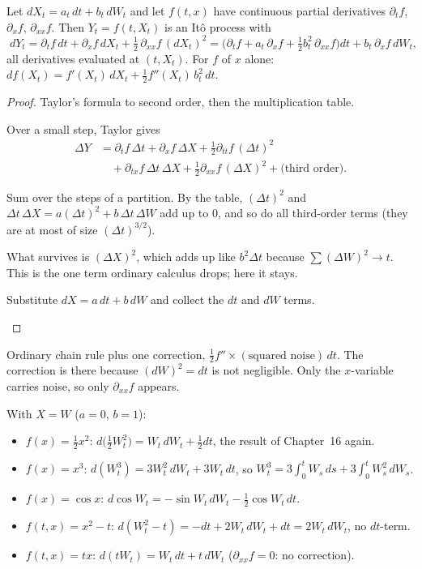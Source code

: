 \begin{theorem}
\label{thm:ito}
Let $dX_t=a_t\,dt+b_t\,dW_t$ and let $f(t,x)$ have continuous partial derivatives $\partial_tf$, $\partial_xf$, $\partial_{xx}f$. Then $Y_t=f(t,X_t)$ is an Itô process with
\[
  \boxed{\;dY_t=\partial_tf\,dt+\partial_xf\,dX_t+\tfrac12\,\partial_{xx}f\,(dX_t)^2
  =\Big(\partial_tf+a_t\,\partial_xf+\tfrac12b_t^2\,\partial_{xx}f\Big)dt+b_t\,\partial_xf\,dW_t,\;}
\]
all derivatives evaluated at $(t,X_t)$. For $f$ of $x$ alone: $df(X_t)=f'(X_t)\,dX_t+\frac12f''(X_t)\,b_t^2\,dt$.
\end{theorem}
\begin{proof}
Taylor's formula to second order, then the multiplication table.
\begin{steps}
  \item Over a small step, Taylor gives
  \[
    \begin{aligned}
    \Delta Y&=\partial_tf\,\Delta t+\partial_xf\,\Delta X+\tfrac12\partial_{tt}f\,(\Delta t)^2\\
    &\quad+\partial_{tx}f\,\Delta t\,\Delta X+\tfrac12\partial_{xx}f\,(\Delta X)^2+\text{(third order)}.
    \end{aligned}
  \]
  \item Sum over the steps of a partition. By the table, $(\Delta t)^2$ and $\Delta t\,\Delta X=a(\Delta t)^2+b\,\Delta t\,\Delta W$ add up to $0$, and so do all third-order terms (they are at most of size $(\Delta t)^{3/2}$).
  \item What survives is $(\Delta X)^2$, which adds up like $b^2\Delta t$ because $\sum(\Delta W)^2\to t$. This is the one term ordinary calculus drops; here it stays.
  \item Substitute $dX=a\,dt+b\,dW$ and collect the $dt$ and $dW$ terms. \qedhere
\end{steps}
\end{proof}

\begin{intuition}
Ordinary chain rule plus one correction, $\frac12f''\times(\text{squared noise})\,dt$. The correction is there because $(dW)^2=dt$ is not negligible. Only the $x$-variable carries noise, so only $\partial_{xx}f$ appears.
\end{intuition}

\begin{example}
\label{ex:ito-first}
With $X=W$ ($a=0$, $b=1$):
\begin{itemize}
  \item $f(x)=\frac12x^2$: $d\big(\frac12W_t^2\big)=W_t\,dW_t+\frac12dt$, the result of Chapter~16 again.
  \item $f(x)=x^3$: $d(W_t^3)=3W_t^2\,dW_t+3W_t\,dt$, so $W_t^3=3\int_0^tW_s\,ds+3\int_0^tW_s^2\,dW_s$.
  \item $f(x)=\cos x$: $d\cos W_t=-\sin W_t\,dW_t-\frac12\cos W_t\,dt$.
  \item $f(t,x)=x^2-t$: $d(W_t^2-t)=-dt+2W_t\,dW_t+dt=2W_t\,dW_t$, no $dt$-term.
  \item $f(t,x)=tx$: $d(tW_t)=W_t\,dt+t\,dW_t$ ($\partial_{xx}f=0$: no correction).
\end{itemize}
\end{example}

